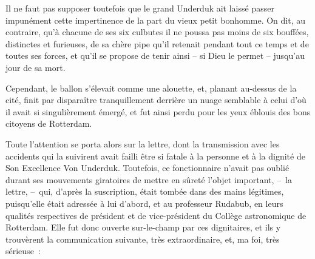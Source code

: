 \documentclass[french,twoside]{book} %
\begin{document}
Il ne faut pas supposer toutefois que le grand Underduk ait laissé passer impunément cette impertinence de la part du vieux petit bonhomme. On dit, au contraire, qu’à chacune de ses six culbutes il ne poussa pas moins de six bouffées, distinctes et furieuses, de sa chère pipe qu’il retenait pendant tout ce temps et de toutes ses forces, et qu’il se propose de tenir ainsi – si Dieu le permet – jusqu’au jour de sa mort.\par
Cependant, le ballon s’élevait comme une alouette, et, planant au-dessus de la cité, finit par disparaître tranquillement derrière un nuage semblable à celui d’où il avait si singulièrement émergé, et fut ainsi perdu pour les yeux éblouis des bons citoyens de Rotterdam.\par
Toute l’attention se porta alors sur la lettre, dont la transmission avec les accidents qui la suivirent avait failli être si fatale à la personne et à la dignité de Son Excellence Von Underduk. Toutefois, ce fonctionnaire n’avait pas oublié durant ses mouvements giratoires de mettre en sûreté l’objet important, – la lettre, – qui, d’après la suscription, était tombée dans des mains légitimes, puisqu’elle était adressée à lui d’abord, et au professeur Rudabub, en leurs qualités respectives de président et de vice-président du Collège astronomique de Rotterdam. Elle fut donc ouverte sur-le-champ par ces dignitaires, et ils y trouvèrent la communication suivante, très extraordinaire, et, ma foi, très sérieuse :\par
\bigbreak
{}\par
\end{document}
